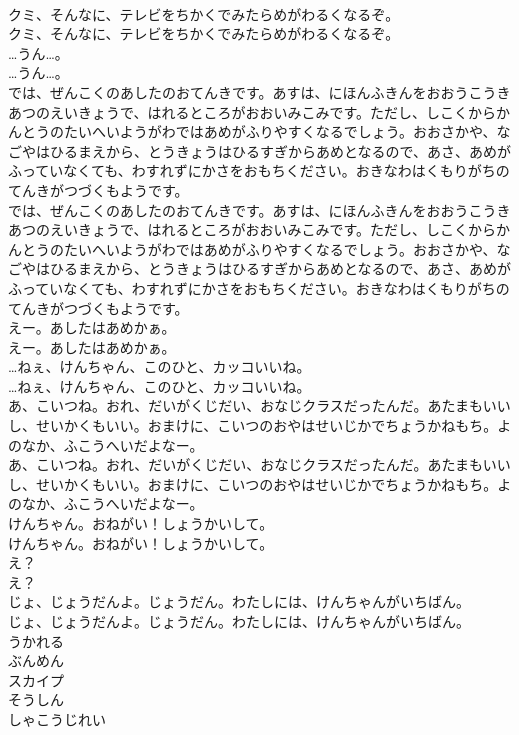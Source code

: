 \documentclass[8pt]{extreport}
\begin{document}
\begin{CJK}{UTF8}{min}
\\	クミ、そんなに、テレビをちかくでみたらめがわるくなるぞ。
\\	クミ、そんなに、テレビをちかくでみたらめがわるくなるぞ。
\\	…うん…。
\\	…うん…。
\\	では、ぜんこくのあしたのおてんきです。あすは、にほんふきんをおおうこうきあつのえいきょうで、はれるところがおおいみこみです。ただし、しこくからかんとうのたいへいようがわではあめがふりやすくなるでしょう。おおさかや、なごやはひるまえから、とうきょうはひるすぎからあめとなるので、あさ、あめがふっていなくても、わすれずにかさをおもちください。おきなわはくもりがちのてんきがつづくもようです。
\\	では、ぜんこくのあしたのおてんきです。あすは、にほんふきんをおおうこうきあつのえいきょうで、はれるところがおおいみこみです。ただし、しこくからかんとうのたいへいようがわではあめがふりやすくなるでしょう。おおさかや、なごやはひるまえから、とうきょうはひるすぎからあめとなるので、あさ、あめがふっていなくても、わすれずにかさをおもちください。おきなわはくもりがちのてんきがつづくもようです。
\\	えー。あしたはあめかぁ。
\\	えー。あしたはあめかぁ。
\\	…ねぇ、けんちゃん、このひと、カッコいいね。
\\	…ねぇ、けんちゃん、このひと、カッコいいね。
\\	あ、こいつね。おれ、だいがくじだい、おなじクラスだったんだ。あたまもいいし、せいかくもいい。おまけに、こいつのおやはせいじかでちょうかねもち。よのなか、ふこうへいだよなー。
\\	あ、こいつね。おれ、だいがくじだい、おなじクラスだったんだ。あたまもいいし、せいかくもいい。おまけに、こいつのおやはせいじかでちょうかねもち。よのなか、ふこうへいだよなー。
\\	けんちゃん。おねがい！しょうかいして。
\\	けんちゃん。おねがい！しょうかいして。
\\	え？
\\	え？
\\	じょ、じょうだんよ。じょうだん。わたしには、けんちゃんがいちばん。
\\	じょ、じょうだんよ。じょうだん。わたしには、けんちゃんがいちばん。
\\	うかれる
\\	ぶんめん
\\	スカイプ
\\	そうしん
\\	しゃこうじれい

\end{CJK}
\end{document}
